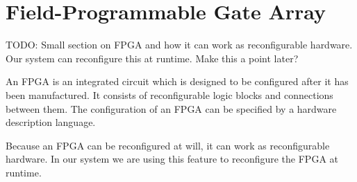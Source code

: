 \section{Field-Programmable Gate Array}
TODO: Small section on FPGA and how it can work as reconfigurable hardware. Our system can reconfigure this at runtime. Make this a point later?

An FPGA is an integrated circuit which is designed to be configured after it has been manufactured. It consists of reconfigurable logic blocks and connections between them. The configuration of an FPGA can be specified by a hardware description language.

Because an FPGA can be reconfigured at will, it can work as reconfigurable hardware. In our system we are using this feature to reconfigure the FPGA at runtime.
